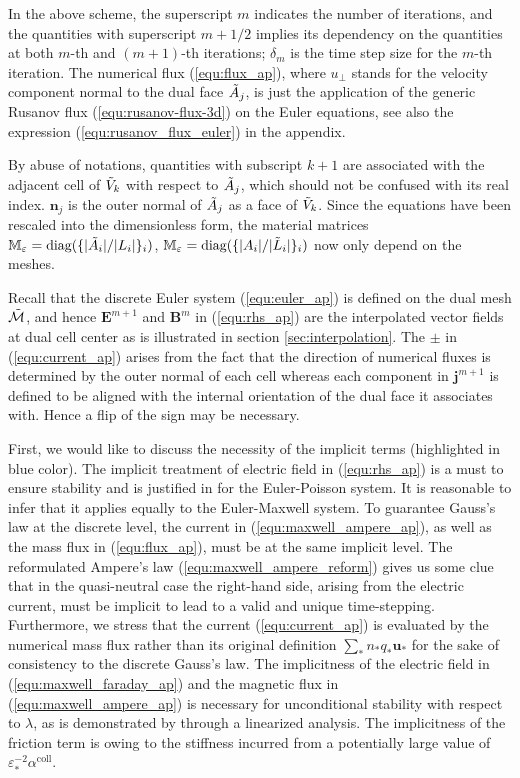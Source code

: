 \documentclass{article}
\begin{document}
In the above scheme, the superscript $m$ indicates the number of iterations, and the quantities with superscript $m+1/2$ implies its dependency on the quantities at both $m$-th and $(m+1)$-th iterations; $\delta_m$ is the time step size for the $m$-th iteration. The numerical flux (\ref{equ:flux_ap}), where $u_\perp$ stands for the velocity component normal to the dual face $\Tilde{A}_j$, is just the application of the generic Rusanov flux (\ref{equ:rusanov-flux-3d}) on the Euler equations, see also the expression (\ref{equ:rusanov_flux_euler}) in the appendix.  

By abuse of notations, quantities with subscript $k+1$ are associated with the adjacent cell of $\Tilde{V}_k$ with respect to $\Tilde{A}_j$, which should not be confused with its real index. $\mathbf{n}_j$ is the outer normal of $\Tilde{A}_j$ as a face of $\Tilde{V}_k$. Since the equations have been rescaled into the dimensionless form, the material matrices $\mathbb{M}_\varepsilon = \text{diag}(\{|\Tilde{A}_i|/{|L_i|}\}_i)$, $\mathbb{M}_\varepsilon = \text{diag}(\{{|A_i|}/{|\Tilde{L}_i|}\}_i)$ now only depend on the meshes. 

Recall that the discrete Euler system (\ref{equ:euler_ap}) is defined on the dual mesh $\Tilde{\mathcal{M}}$, and hence $\mathbf{E}^{m+1}$ and $\mathbf{B}^m$ in (\ref{equ:rhs_ap}) are the interpolated vector fields at dual cell center as is illustrated in section \ref{sec:interpolation}. The $\pm$ in (\ref{equ:current_ap}) arises from the fact that the direction of numerical fluxes is determined by the outer normal of each cell whereas each component in $\mathbf{j}^{m+1}$ is defined to be aligned with the internal orientation of the dual face it associates with. Hence a flip of the sign may be necessary. 

First, we would like to discuss the necessity of the implicit terms (highlighted in blue color). The implicit treatment of electric field in (\ref{equ:rhs_ap}) is a must to ensure stability and is justified in \cite{fabre_1992} for the Euler-Poisson system. It is reasonable to infer that it applies equally to the Euler-Maxwell system. To guarantee Gauss's law at the discrete level, the current in (\ref{equ:maxwell_ampere_ap}), as well as the mass flux in (\ref{equ:flux_ap}), must be at the same implicit level. The reformulated Ampere's law (\ref{equ:maxwell_ampere_reform}) gives us some clue that in the quasi-neutral case the right-hand side, arising from the electric current, must be implicit to lead to a valid and unique time-stepping. Furthermore, we stress that the current (\ref{equ:current_ap}) is evaluated by the numerical mass flux rather than its original definition $\sum_*n_*q_*\mathbf{u}_*$ for the sake of consistency to the discrete Gauss's law. The implicitness of the electric field in (\ref{equ:maxwell_faraday_ap}) and the magnetic flux in (\ref{equ:maxwell_ampere_ap}) is necessary for unconditional stability with respect to $\lambda$, as is demonstrated by \cite{degond_2012} through a linearized analysis. The implicitness of the friction term is owing to the stiffness incurred from a potentially large value of $\varepsilon^{-2}_*\alpha^\text{coll}$.
\end{document}
